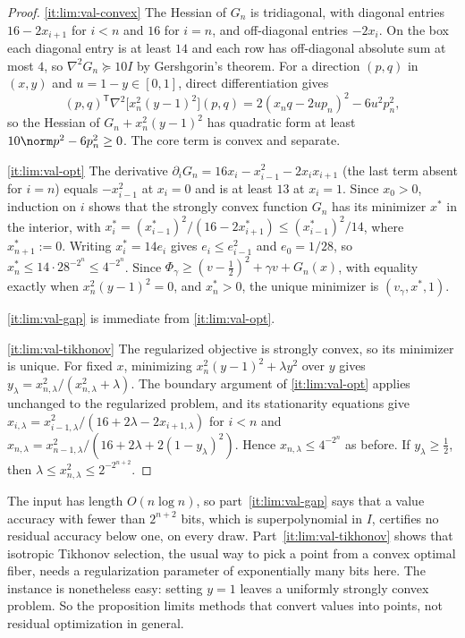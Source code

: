 \begin{proof}
\ref{it:lim:val-convex}
The Hessian of $G_n$ is tridiagonal, with diagonal entries $16-2x_{i+1}$
for $i<n$ and $16$ for $i=n$, and off-diagonal entries $-2x_i$. On the box
each diagonal entry is at least $14$ and each row has off-diagonal absolute
sum at most $4$, so $\nabla^2G_n\succeq10I$ by Gershgorin's theorem. For a
direction $(p,q)$ in $(x,y)$ and $u=1-y\in[0,1]$, direct differentiation
gives
\[
 (p,q)^{\mathsf T}\nabla^2\bigl[x_n^2(y-1)^2\bigr](p,q)
 =2(x_nq-2up_n)^2-6u^2p_n^2,
\]
so the Hessian of $G_n+x_n^2(y-1)^2$ has quadratic form at least
$10\norm p^2-6p_n^2\ge0$. The core term is convex and separate.

\ref{it:lim:val-opt}
The derivative $\partial_iG_n=16x_i-x_{i-1}^2-2x_ix_{i+1}$ (the last term
absent for $i=n$) equals $-x_{i-1}^2$ at $x_i=0$ and is at least $13$ at
$x_i=1$. Since $x_0>0$, induction on $i$ shows that the strongly convex
function $G_n$ has its minimizer $x^*$ in the interior, with
$x_i^*=(x_{i-1}^*)^2/(16-2x_{i+1}^*)\le(x_{i-1}^*)^2/14$, where
$x_{n+1}^*:=0$. Writing $x_i^*=14e_i$ gives $e_i\le e_{i-1}^2$ and
$e_0=1/28$, so $x_n^*\le14\cdot28^{-2^n}\le4^{-2^n}$. Since
$\Phi_\gamma\ge(v-\frac12)^2+\gamma v+G_n(x)$, with equality exactly when
$x_n^2(y-1)^2=0$, and $x_n^*>0$, the unique minimizer is
$(v_\gamma,x^*,1)$.

\ref{it:lim:val-gap} is immediate from \ref{it:lim:val-opt}.

\ref{it:lim:val-tikhonov}
The regularized objective is strongly convex, so its minimizer is unique.
For fixed $x$, minimizing $x_n^2(y-1)^2+\lambda y^2$ over $y$ gives
$y_\lambda=x_{n,\lambda}^2/(x_{n,\lambda}^2+\lambda)$. The boundary argument
of \ref{it:lim:val-opt} applies unchanged to the regularized problem, and
its stationarity equations give
$x_{i,\lambda}=x_{i-1,\lambda}^2/(16+2\lambda-2x_{i+1,\lambda})$ for $i<n$
and $x_{n,\lambda}=x_{n-1,\lambda}^2/(16+2\lambda+2(1-y_\lambda)^2)$. Hence
$x_{n,\lambda}\le4^{-2^n}$ as before. If $y_\lambda\ge\frac12$, then
$\lambda\le x_{n,\lambda}^2\le2^{-2^{n+2}}$.
\end{proof}

The input has length $O(n\log n)$, so part~\ref{it:lim:val-gap} says that a
value accuracy with fewer than $2^{n+2}$ bits, which is superpolynomial in
$I$, certifies no residual accuracy below one, on every draw.
Part~\ref{it:lim:val-tikhonov} shows that isotropic Tikhonov selection, the
usual way to pick a point from a convex optimal fiber, needs a
regularization parameter of exponentially many bits here. The instance is
nonetheless easy: setting $y=1$ leaves a uniformly strongly convex problem.
So the proposition limits methods that convert values into points, not
residual optimization in general.

